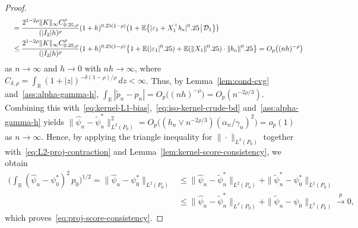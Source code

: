 \documentclass[a4paper]{article}
\newcommand{\R}{\mathbb{R}}
\newcommand{\E}{\mathbb{E}}
\newcommand{\norm}[1]{\|{#1}\|}
\newcommand{\cvp}{\overset{p}{\to}}
\theoremstyle{definition}
\begin{document}
\begin{proof}
\begin{align*}
&\quad= \frac{2^{1 - 2\rho} \norm{K}_\infty C_{\delta,\rho}^\rho}{(|I_2|h)^\rho}(1 + h)^{\delta(1 - \rho)}\bigl(1 + \E\bigl\{|\varepsilon_1 + X_1^\top b_n|^\delta\!\bigm|\!\mathcal{D}_1\bigr\}\bigr) \\
&\quad\leq \frac{2^{1 - 2\rho} \norm{K}_\infty C_{\delta,\rho}^\rho}{(|I_2|h)^\rho}(1 + h)^{\delta(1 - \rho)}\bigl\{1 + \E(|\varepsilon_1|^\delta) + \E(\norm{X_1}^\delta) \cdot \norm{b_n}^\delta\bigr\} = O_p\bigl((nh)^{-\rho}\bigr)
\end{align*}
as $n \to \infty$ and $h \to 0$ with $nh \to \infty$, where $C_{\delta,\rho} = \int_\R (1 + |z|)^{-\delta(1 - \rho)/\rho}\,dz < \infty$. Thus, by Lemma~\ref{lem:cond-cvg} and~\ref{ass:alpha-gamma-h}, $\int_\R |\tilde{p}_n - p_n| = O_p\bigl((nh)^{-\rho}\bigr) = O_p(n^{-2\rho/3})$. Combining this with~\eqref{eq:kernel-L1-bias},~\eqref{eq:iso-kernel-crude-bd} and~\ref{ass:alpha-gamma-h} yields $\norm{\hat{\psi}_n - \tilde{\psi}_n^*}_{L^2(P_0)}^2 = O_p\bigl((h_n \vee n^{-2\rho/3})(\alpha_n/\gamma_n)^2\bigr) = o_p(1)$ as $n \to \infty$. 
Hence, by applying the triangle inequality for $\norm{{\cdot}}_{L^2(P_0)}$ together with~\eqref{eq:L2-proj-contraction} and Lemma~\ref{lem:kernel-score-consistency}, we obtain
\begin{align*}
\biggl(\int_\R (\hat{\psi}_n - \psi_0^*)^2\,p_0\biggr)^{1/2} = \norm{\hat{\psi}_n - \psi_0^*}_{L^2(P_0)} &\leq \norm{\hat{\psi}_n - \tilde{\psi}_n^*}_{L^2(P_0)} + \norm{\tilde{\psi}_n^* - \psi_0^*}_{L^2(P_0)}\\
&\leq \norm{\hat{\psi}_n - \tilde{\psi}_n^*}_{L^2(P_0)} + \norm{\tilde{\psi}_n - \psi_0}_{L^2(P_0)} \cvp 0,
\end{align*}
which proves~\eqref{eq:proj-score-consistency}.


\end{proof}
\end{document}
